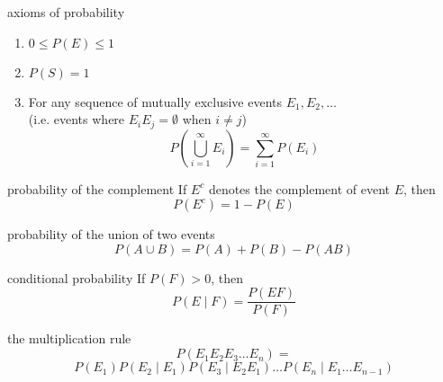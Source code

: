 \documentclass[avery5371,grid]{flashcards}
\begin{document}
\begin{flashcard}[Axioms]{axioms of probability}
\begin{enumerate}
\item $0 \leq P(E) \leq 1$
\item $P(S) = 1$
\item For any sequence of mutually exclusive events $E_1,E_2,\ldots$ \\
(i.e. events where $E_i E_j = \emptyset$ when $i\neq j$)
\begin{displaymath}
P \left( \bigcup_{i=1}^{\infty} E_i \right) = \sum_{i=1}^{\infty} P(E_i)
\end{displaymath}
\end{enumerate}
\end{flashcard}

\begin{flashcard}[Proposition]{probability of the complement}
If $E^c$ denotes the complement of event $E$, then
\begin{displaymath}
P(E^c) = 1 - P(E)
\end{displaymath}
\end{flashcard}

\begin{flashcard}[Proposition]{probability of the union of two events}
\begin{displaymath}
P(A \cup B) = P(A) + P(B) - P(A B)
\end{displaymath}
\end{flashcard}

\begin{flashcard}[Definition]{conditional probability}
If $P(F) > 0$, then
\begin{displaymath}
P(E\mid F) = \frac{P(EF)}{P(F)}
\end{displaymath}
\end{flashcard}

\begin{flashcard}[Theorem]{the multiplication rule}
\begin{displaymath}
P(E_1 E_2 E_3 \ldots E_n) = 
\end{displaymath}
\begin{displaymath}
P(E_1)P(E_2\mid E_1)P(E_3 \mid E_2 E_1)\ldots P(E_n\mid E_1 \ldots E_{n-1})
\end{displaymath}
\end{flashcard}
\end{document}

